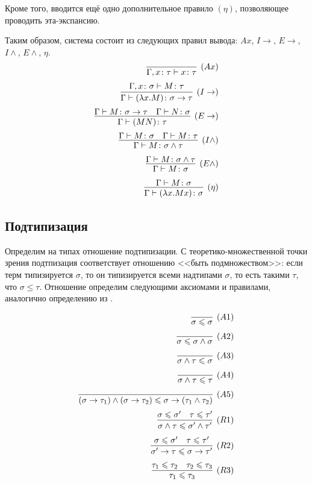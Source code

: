 \documentclass{spbau-diploma}
\begin{document}
Кроме того, вводится ещё одно дополнительное правило $(\eta)$, позволяющее проводить эта-экспансию. 

Таким образом, система состоит из следующих правил вывода: $Ax$, $I\to$, $E\to$, $I\wedge$, $E\wedge$, $\eta$.
\begin{equation} \label{rules eta}
\begin{aligned}
\infer[(Ax)]{\Gamma, x \colon \tau \vdash x \colon \tau}{}\\[2pt]
\infer[(I\to)]{\Gamma \vdash (\lambda x . M) \colon \sigma \to \tau}{\Gamma, x \colon \sigma \vdash M \colon \tau}\\[2pt]
\infer[(E\to)]{\Gamma \vdash (MN) \colon \tau}{\Gamma \vdash M \colon \sigma \to \tau & \Gamma \vdash N \colon \sigma}\\[2pt]
\infer[(I\wedge)]{\Gamma \vdash M \colon \sigma \wedge \tau}{\Gamma \vdash M \colon \sigma & \Gamma \vdash M \colon \tau}\\[2pt]
\infer[(E\wedge)]{\Gamma \vdash M \colon \sigma}{\Gamma \vdash M \colon \sigma \wedge \tau}\\[2pt]
\infer[(\eta)]{\Gamma \vdash (\lambda x . M x) \colon \sigma}{\Gamma \vdash M \colon \sigma}

\end{aligned}
\end{equation}

\subsection{Подтипизация}


Определим на типах отношение подтипизации. С теоретико-множественной точки зрения подтпизация соответствует отношению <<быть подмножеством>>: если терм типизируется $\sigma$, то он типизируется всеми надтипами $\sigma$, то есть такими $\tau$, что $\sigma \leqslant \tau$. Отношение определим следующими аксиомами и правилами, аналогично определению из \cite{hindley_82}.

\begin{equation} \label{rules leq}
\begin{aligned}
\infer[(A1)]{\sigma \leqslant \sigma}{} \\[2pt]
\infer[(A2)]{\sigma \leqslant \sigma \wedge \sigma}{} \\[2pt]
\infer[(A3)]{\sigma \wedge \tau \leqslant \sigma}{} \\[2pt]
\infer[(A4)]{\sigma \wedge \tau \leqslant \tau}{} \\[2pt]
\infer[(A5)]{(\sigma \to \tau_1) \wedge (\sigma \to \tau_2) \leqslant \sigma \to (\tau_1 \wedge \tau_2)}{} \\[2pt]
\infer[(R1)]{\sigma \wedge \tau \leqslant \sigma' \wedge \tau'}{\sigma \leqslant \sigma' & \tau \leqslant \tau'} \\[2pt]
\infer[(R2)]{\sigma' \to \tau \leqslant \sigma \to \tau'}{\sigma \leqslant \sigma' & \tau \leqslant \tau'} \\[2pt]
\infer[(R3)]{\tau_1 \leqslant \tau_3}{\tau_1 \leqslant \tau_2 & \tau_2 \leqslant \tau_3} 
\end{aligned}
\end{equation}
\end{document}
